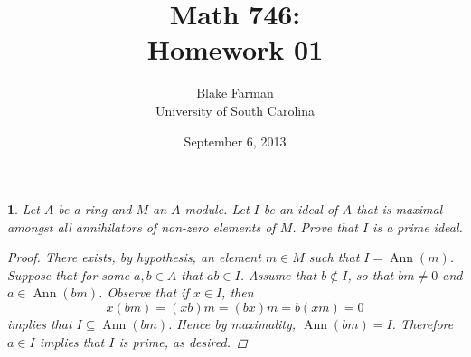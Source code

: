 \documentclass[10pt]{amsart}
\author{Blake Farman\\University of South Carolina}
\title{Math 746:\\Homework 01}
\date{September 6, 2013}
\begin{document}
\maketitle

\providecommand{\p}{\mathfrak{p}}
\providecommand{\m}{\mathfrak{m}}
\providecommand{\Ann}[1]{\operatorname{Ann}\left(#1\right)}
\newtheorem{thm}{}
\newtheorem{lem}{Lemma}

\begin{thm}
	Let $A$ be a ring and $M$ an $A$-module.
	Let $I$ be an ideal of $A$ that is maximal amongst all annihilators of non-zero elements of $M$.
	Prove that $I$ is a prime ideal.

\begin{proof}
	There exists, by hypothesis, an element $m \in M$ such that $I = \Ann{m}$.
	Suppose that for some $a, b \in A$ that $ab \in I$.
	Assume that $b \not \in I$, so that $bm \neq 0$ and $a \in \Ann{bm}$.
	Observe that if $x \in I$, then
		$$x(bm) = (xb)m = (bx)m = b(xm) = 0$$
	implies that $I \subseteq \Ann{bm}$.
	Hence by maximality, $\Ann{bm} = I$.
	Therefore $a \in I$ implies that $I$ is prime, as desired.
\end{proof}
\end{thm}
\end{document}
